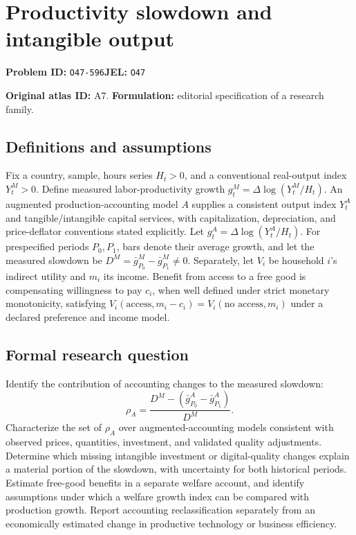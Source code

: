 \documentclass[11pt,a4paper]{article}
\begin{document}
\section*{Productivity slowdown and intangible output}
\textbf{Problem ID:} \texttt{O47-596}\quad \textbf{JEL:} \texttt{O47}\par
\label{problem:OP-0017}
\label{atlas:prob:A7}

\noindent\textbf{Original atlas ID:} A7. \textbf{Formulation:} editorial specification of a research family.

\subsection*{Definitions and assumptions}

Fix a country, sample, hours series $H_t>0$, and a conventional real-output index $Y_t^M>0$. Define measured labor-productivity growth $g_t^M=\Delta\log(Y_t^M/H_t)$. An augmented production-accounting model $A$ supplies a consistent output index $Y_t^A$ and tangible/intangible capital services, with capitalization, depreciation, and price-deflator conventions stated explicitly. Let $g_t^A=\Delta\log(Y_t^A/H_t)$. For prespecified periods $P_0,P_1$, bars denote their average growth, and let the measured slowdown be $D^M=\bar g_{P_0}^M-\bar g_{P_1}^M\ne0$. Separately, let $V_i$ be household $i$'s indirect utility and $m_i$ its income. Benefit from access to a free good is compensating willingness to pay $c_i$, when well defined under strict monetary monotonicity, satisfying $V_i(\text{access},m_i-c_i)=V_i(\text{no access},m_i)$ under a declared preference and income model.

\subsection*{Formal research question}

Identify the contribution of accounting changes to the measured slowdown:
\[
\rho_A=\frac{D^M-(\bar g_{P_0}^A-\bar g_{P_1}^A)}{D^M}.
\]
Characterize the set of $\rho_A$ over augmented-accounting models consistent with observed prices, quantities, investment, and validated quality adjustments. Determine which missing intangible investment or digital-quality changes explain a material portion of the slowdown, with uncertainty for both historical periods. Estimate free-good benefits in a separate welfare account, and identify assumptions under which a welfare growth index can be compared with production growth. Report accounting reclassification separately from an economically estimated change in productive technology or business efficiency.
\end{document}

